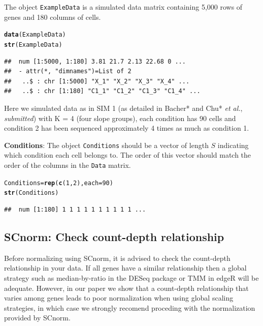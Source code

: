 \documentclass{article}\usepackage[]{graphicx}\usepackage[usenames,dvipsnames]{color}
\makeatletter
\newcommand{\hlnum}[1]{\textcolor[rgb]{0.686,0.059,0.569}{#1}}%
\newcommand{\hlstd}[1]{\textcolor[rgb]{0.345,0.345,0.345}{#1}}%
\newcommand{\hlkwb}[1]{\textcolor[rgb]{0.69,0.353,0.396}{#1}}%
\newcommand{\hlkwc}[1]{\textcolor[rgb]{0.333,0.667,0.333}{#1}}%
\newcommand{\hlkwd}[1]{\textcolor[rgb]{0.737,0.353,0.396}{\textbf{#1}}}%
\newenvironment{kframe}{%
 \def\at@end@of@kframe{}%
 \ifinner\ifhmode%
  \def\at@end@of@kframe{\end{minipage}}%
  \begin{minipage}{\columnwidth}%
 \fi\fi%
 \def\FrameCommand##1{\hskip\@totalleftmargin \hskip-\fboxsep
 \colorbox{shadecolor}{##1}\hskip-\fboxsep
     \hskip-\linewidth \hskip-\@totalleftmargin \hskip\columnwidth}%
 \MakeFramed {\advance\hsize-\width
   \@totalleftmargin\z@ \linewidth\hsize
   \@setminipage}}%
 {\par\unskip\endMakeFramed%
 \at@end@of@kframe}
\newenvironment{knitrout}{}{} %
\makeatother
\begin{document}
\noindent The object \verb+ExampleData+ is a simulated data matrix containing
5,000 rows of genes and 180 columns of cells. 

\begin{knitrout}
\color{fgcolor}\begin{kframe}
\begin{alltt}
\hlkwd{data}\hlstd{(ExampleData)}
\hlkwd{str}\hlstd{(ExampleData)}
\end{alltt}
\begin{verbatim}
##  num [1:5000, 1:180] 3.81 21.7 2.13 22.68 0 ...
##  - attr(*, "dimnames")=List of 2
##   ..$ : chr [1:5000] "X_1" "X_2" "X_3" "X_4" ...
##   ..$ : chr [1:180] "C1_1" "C1_2" "C1_3" "C1_4" ...
\end{verbatim}
\end{kframe}
\end{knitrout}
  
  Here we simulated data as in SIM 1 (as detailed in Bacher* and Chu* {\it et al.}, {\it{submitted}}) with K = 4 (four slope groups), each condition has 90 cells and condition 2 has been 
sequenced approximately 4 times as much as condition 1.

{\bf Conditions}: The object \verb+Conditions+ should be a vector of length $S$ indicating which condition each cell belongs to. The order of this vector should match the order of the columns in the \verb+Data+ matrix.
\begin{knitrout}
\color{fgcolor}\begin{kframe}
\begin{alltt}
\hlstd{Conditions} \hlkwb{=} \hlkwd{rep}\hlstd{(}\hlkwd{c}\hlstd{(}\hlnum{1}\hlstd{,}\hlnum{2}\hlstd{),} \hlkwc{each}\hlstd{=} \hlnum{90}\hlstd{)}
\hlkwd{str}\hlstd{(Conditions)}
\end{alltt}
\begin{verbatim}
##  num [1:180] 1 1 1 1 1 1 1 1 1 1 ...
\end{verbatim}
\end{kframe}
\end{knitrout}
  
  
  
  \subsection{SCnorm: Check count-depth relationship}
\label{sec:checkData}
Before normalizing using SCnorm, it is advised to check the count-depth relationship in your data. If all genes have a similar relationship then a global strategy such as median-by-ratio in the DESeq package or TMM in edgeR will be adequate. However, in our paper we show that a count-depth relationship that varies among genes leads to poor normalization when using global scaling strategies, in which case we strongly recomend proceding with the normalization provided by SCnorm. 
\end{document}
